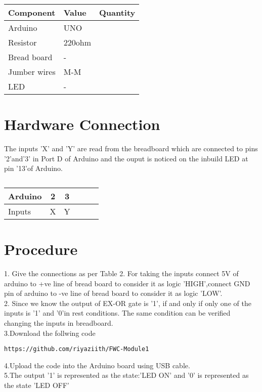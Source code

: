 \documentclass{IEEEtran}
\begin{document}
     \begin{tabularx}{0.4\textwidth} {  
  | >{\centering\arraybackslash}X  
  | >{\centering\arraybackslash}X  
  | >{\centering\arraybackslash}X |}
  \hline
\textbf{Component} &  \textbf{Value} & \textbf{Quantity}\\
\hline
Arduino & UNO & 1 \\  
\hline
Resistor& 220ohm & 1 \\ 
\hline
Bread board & - & 1 \\
\hline
Jumber wires & M-M & 20\\
\hline
LED & - & 1\\
\hline
\end{tabularx}

     
  \section{Hardware Connection}
  The inputs 'X' and 'Y' are read from the breadboard which are connected to pins '2'and'3' in Port D of Arduino and the ouput is noticed on the inbuild LED at pin '13'of Arduino.
	 \begin{table}[htbp]
 \begin{center}
    \begin{tabular}{|l|c|c|c|c|c|} \hline 
  \textbf{Arduino}& \textbf{2} & \textbf{3}\\
   \hline
 Inputs&X&Y\\ \hline
\end{tabular}   
\end{center}
\caption{\label{table:dummytable} }
\end{table}


	\section{Procedure}

1. Give the connections as per Table 2. For taking the inputs connect 5V of arduino to +ve line of bread board to consider it as logic 'HIGH',connect GND pin of arduino to -ve line of bread board to consider it as logic 'LOW'.
\\2. Since we know the output of EX-OR gate is '1', if and only if only one of the inputs is '1' and '0'in rest conditions. The same condition can be verified changing the inputs in breadboard.
\\3.Download the follwing code
\begin{lstlisting}
https://github.com/riyaziith/FWC-Module1
\end{lstlisting}
 4.Upload the code into the Arduino board using USB cable.
\\5.The output '1' is represented as the state:'LED ON' and '0' is represented as the state 'LED OFF'
\end{document}
